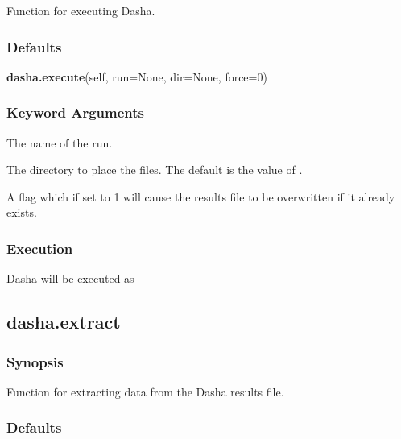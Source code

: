  Function for executing Dasha. 
  

  
 \subsubsection{Defaults} 

 \textsf{\textbf{dasha.execute}(self, run=None, dir=None, force=0)} 

  
 \subsubsection{Keyword Arguments} 

   The name of the run.   

   The directory to place the files.  The default is the value of .   

   A flag which if set to 1 will cause the results file to be overwritten if it already exists.  

  

  
 \subsubsection{Execution} 

 Dasha will be executed as 
  


  

 \newpage 

 \subsection{dasha.extract} 

  
 \subsubsection{Synopsis} 

 Function for extracting data from the Dasha results file. 
  

  
 \subsubsection{Defaults} 

